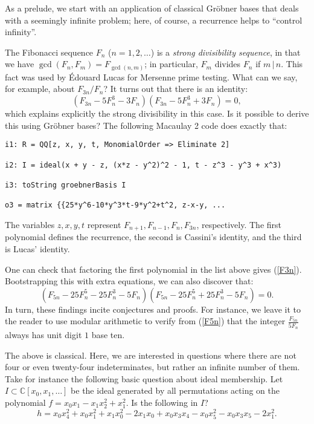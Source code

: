 As a prelude, we start with an application of classical Gr\"obner bases that deals with a seemingly infinite problem; here, of course, a recurrence helps to ``control infinity''.  

The Fibonacci sequence $F_n$ ($n= 1, 2, \ldots$) is a \textit{strong divisibility sequence}, in that we have $\gcd(F_n, F_m) = F_{\gcd(n,m)}$; in particular, $F_m$ divides $F_n$ if $m \, | \, n$.  This fact was used by \'Edouard Lucas for Mersenne prime testing.  What can we say, for example, about $F_{3n}/F_n$?  It turns out that there is an identity:
\begin{equation}\label{F3n}
(F_{3n} - 5 F_n^3 - 3 F_n)(F_{3n} - 5 F_n^3 + 3 F_n) = 0,
\end{equation}
which explains explicitly the strong divisibility in this case.   Is it possible to derive this using Gr\"obner bases?  The following Macaulay 2 code does exactly that:
\begin{M2}
\begin{verbatim}
i1: R = QQ[z, x, y, t, MonomialOrder => Eliminate 2]

i2: I = ideal(x + y - z, (x*z - y^2)^2 - 1, t - z^3 - y^3 + x^3)

i3: toString groebnerBasis I

o3 = matrix {{25*y^6-10*y^3*t-9*y^2+t^2, z-x-y, ...
\end{verbatim}
\end{M2}  
The variables $z,x,y,t$ represent $F_{n+1}, F_{n-1}, F_n, F_{3n}$, respectively.  The first polynomial defines the recurrence, the second is Cassini's identity, and the third is Lucas' identity.

One can check that factoring the first polynomial in the list above gives (\ref{F3n}).  Bootstrapping this with extra equations, we can also discover that:
\begin{equation}\label{F5n}
(F_{5n} - 25 F_n^5 - 25 F_n^3 - 5 F_n)(F_{5n} - 25 F_n^5 + 25 F_n^3 - 5 F_n) = 0.
\end{equation}
In turn, these findings incite conjectures and proofs.  
For instance, we leave it to the reader to use modular arithmetic to verify from (\ref{F5n}) that the integer $\frac{F_{5n}}{5F_n}$ always has unit digit $1$ base ten.  

The above is classical.  Here, we are interested  in questions where there are not four or even twenty-four indeterminates, but rather an infinite number of them.  Take for instance the following basic question about ideal membership.  Let $I \subset \mathbb C[x_0,x_1,\ldots]$ be the ideal generated by all permutations acting on the polynomial $f = x_0 x_1 - x_1 x_2^2 +x_1^2$.  Is the following in $I$?
\[ h = x_0 x_4^2 + x_0 x_1^2  +x_1 x_0^2 - 2 x_1 x_0 + x_0 x_3 x_4 - x_0 x_5^2 - x_0 x_3 x_5 - 2 x_1^2.\]


